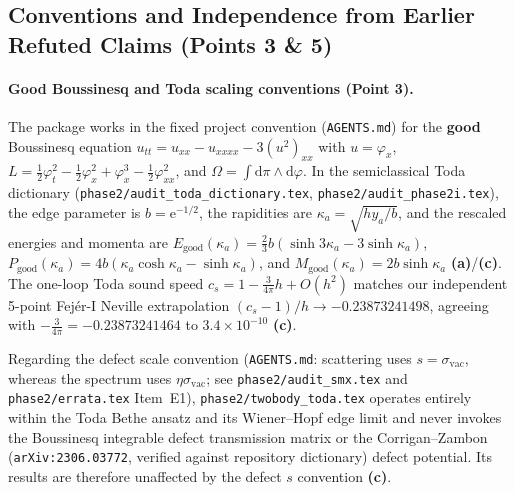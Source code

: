 \documentclass[11pt,a4paper]{article}
\newcommand{\dd}{\mathrm{d}}
\newcommand{\ee}{\mathrm{e}}
\begin{document}
\subsection{Conventions and Independence from Earlier Refuted Claims (Points 3 \& 5)}

\paragraph{Good Boussinesq and Toda scaling conventions (Point 3).}
The package works in the fixed project convention (\texttt{AGENTS.md}) for the \textbf{good} Boussinesq equation $u_{tt}=u_{xx}-u_{xxxx}-3(u^2)_{xx}$ with $u=\varphi_x$, $L=\frac12\varphi_t^2-\frac12\varphi_x^2+\varphi_x^3-\frac12\varphi_{xx}^2$, and $\Omega=\int\dd\pi\wedge\dd\varphi$. In the semiclassical Toda dictionary (\texttt{phase2/audit\_toda\_dictionary.tex}, \texttt{phase2/audit\_phase2i.tex}), the edge parameter is $b=\ee^{-1/2}$, the rapidities are $\kappa_a=\sqrt{h y_a/b}$, and the rescaled energies and momenta are $E_{\mathrm{good}}(\kappa_a)=\frac{2}{3}b(\sinh 3\kappa_a-3\sinh\kappa_a)$, $P_{\mathrm{good}}(\kappa_a)=4b(\kappa_a\cosh\kappa_a-\sinh\kappa_a)$, and $M_{\mathrm{good}}(\kappa_a)=2b\sinh\kappa_a$ \textbf{(a)}/\textbf{(c)}. The one-loop Toda sound speed $c_s = 1 - \frac{3}{4\pi}h + O(h^2)$ matches our independent 5-point Fej\'er-I Neville extrapolation $(c_s-1)/h \to -0.23873241498$, agreeing with $-\frac{3}{4\pi}=-0.23873241464$ to $3.4\times 10^{-10}$ \textbf{(c)}.

Regarding the defect scale convention (\texttt{AGENTS.md}: scattering uses $s=\sigma_{\mathrm{vac}}$, whereas the spectrum uses $\eta\sigma_{\mathrm{vac}}$; see \texttt{phase2/audit\_smx.tex} and \texttt{phase2/errata.tex} Item~E1), \texttt{phase2/twobody\_toda.tex} operates entirely within the Toda Bethe ansatz and its Wiener--Hopf edge limit and never invokes the Boussinesq integrable defect transmission matrix or the Corrigan--Zambon (\texttt{arXiv:2306.03772}, verified against repository dictionary) defect potential. Its results are therefore unaffected by the defect $s$ convention \textbf{(c)}.
\end{document}
